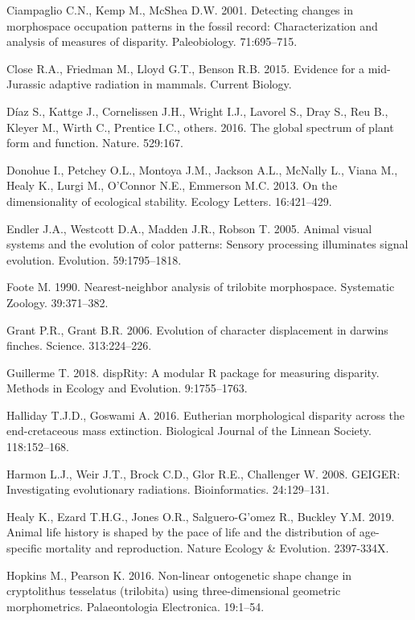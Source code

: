 \documentclass[]{article}
\begin{document}
\hypertarget{ref-ciampaglio2001}{}
Ciampaglio C.N., Kemp M., McShea D.W. 2001. Detecting changes in
morphospace occupation patterns in the fossil record: Characterization
and analysis of measures of disparity. Paleobiology. 71:695--715.

\hypertarget{ref-close2015}{}
Close R.A., Friedman M., Lloyd G.T., Benson R.B. 2015. Evidence for a
mid-Jurassic adaptive radiation in mammals. Current Biology.

\hypertarget{ref-diaz2016}{}
Díaz S., Kattge J., Cornelissen J.H., Wright I.J., Lavorel S., Dray S.,
Reu B., Kleyer M., Wirth C., Prentice I.C., others. 2016. The global
spectrum of plant form and function. Nature. 529:167.

\hypertarget{ref-donohue2013}{}
Donohue I., Petchey O.L., Montoya J.M., Jackson A.L., McNally L., Viana
M., Healy K., Lurgi M., O'Connor N.E., Emmerson M.C. 2013. On the
dimensionality of ecological stability. Ecology Letters. 16:421--429.

\hypertarget{ref-endler2005}{}
Endler J.A., Westcott D.A., Madden J.R., Robson T. 2005. Animal visual
systems and the evolution of color patterns: Sensory processing
illuminates signal evolution. Evolution. 59:1795--1818.

\hypertarget{ref-foote1990}{}
Foote M. 1990. Nearest-neighbor analysis of trilobite morphospace.
Systematic Zoology. 39:371--382.

\hypertarget{ref-grant2006}{}
Grant P.R., Grant B.R. 2006. Evolution of character displacement in
darwins finches. Science. 313:224--226.

\hypertarget{ref-disprity}{}
Guillerme T. 2018. dispRity: A modular R package for measuring
disparity. Methods in Ecology and Evolution. 9:1755--1763.

\hypertarget{ref-halliday2015}{}
Halliday T.J.D., Goswami A. 2016. Eutherian morphological disparity
across the end-cretaceous mass extinction. Biological Journal of the
Linnean Society. 118:152--168.

\hypertarget{ref-geiger2008}{}
Harmon L.J., Weir J.T., Brock C.D., Glor R.E., Challenger W. 2008.
GEIGER: Investigating evolutionary radiations. Bioinformatics.
24:129--131.

\hypertarget{ref-healy2019}{}
Healy K., Ezard T.H.G., Jones O.R., Salguero-G'omez R., Buckley Y.M.
2019. Animal life history is shaped by the pace of life and the
distribution of age-specific mortality and reproduction. Nature Ecology
\& Evolution. 2397-334X.

\hypertarget{ref-hopkins2016}{}
Hopkins M., Pearson K. 2016. Non-linear ontogenetic shape change in
cryptolithus tesselatus (trilobita) using three-dimensional geometric
morphometrics. Palaeontologia Electronica. 19:1--54.
\end{document}
